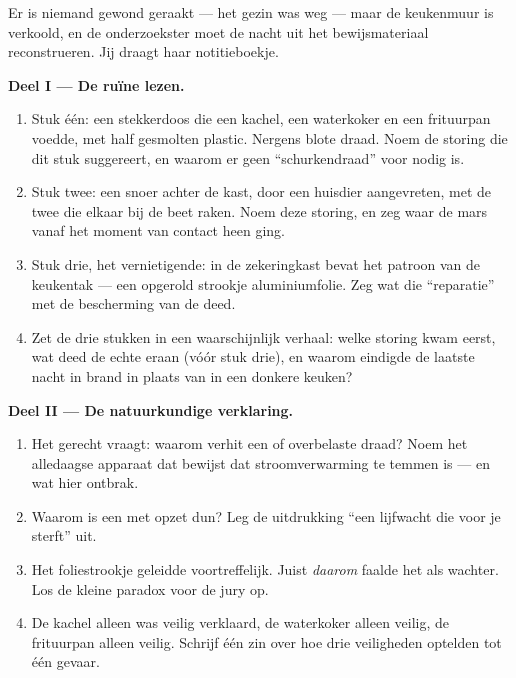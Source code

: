 \begin{problem}\label{pb:g7:short-circuits-safety:1}
Er is niemand gewond geraakt --- het gezin was weg --- maar de
keukenmuur is verkoold, en de onderzoekster moet de nacht uit het
bewijsmateriaal reconstrueren. Jij draagt haar notitieboekje.

\medskip\noindent\textbf{Deel I --- De ruïne lezen.}
\begin{enumerate}
  \item Stuk één: een stekkerdoos die een kachel, een waterkoker en
        een frituurpan voedde, met half gesmolten plastic. Nergens
        blote draad. Noem de storing die dit stuk suggereert, en
        waarom er geen ``schurkendraad'' voor nodig is.
  \item Stuk twee: een snoer achter de kast, door een huisdier
        aangevreten, met de twee  die elkaar bij de beet
        raken. Noem deze storing, en zeg waar de mars vanaf het
        moment van contact heen ging.
  \item Stuk drie, het vernietigende: in de zekeringkast bevat het
        patroon van de keukentak --- een opgerold strookje
        aluminiumfolie. Zeg wat die ``reparatie'' met de bescherming
        van de  deed.
  \item Zet de drie stukken in een waarschijnlijk verhaal: welke
        storing kwam eerst, wat deed de echte  eraan (vóór
        stuk drie), en waarom eindigde de laatste nacht in brand in
        plaats van in een donkere keuken?
\end{enumerate}

\medskip\noindent\textbf{Deel II --- De natuurkundige verklaring.}
\begin{enumerate}[resume]
  \item Het gerecht vraagt: waarom verhit een  of
        overbelaste draad? Noem het alledaagse apparaat dat bewijst
        dat stroomverwarming te temmen is --- en wat hier ontbrak.
  \item Waarom is een  met opzet dun? Leg de uitdrukking
        ``een lijfwacht die voor je sterft'' uit.
  \item Het foliestrookje geleidde voortreffelijk. Juist
        \emph{daarom} faalde het als wachter. Los de kleine paradox
        voor de jury op.
  \item De kachel alleen was veilig verklaard, de waterkoker alleen
        veilig, de frituurpan alleen veilig. Schrijf één zin over hoe
        drie veiligheden optelden tot één gevaar.
\end{enumerate}


\end{problem}
